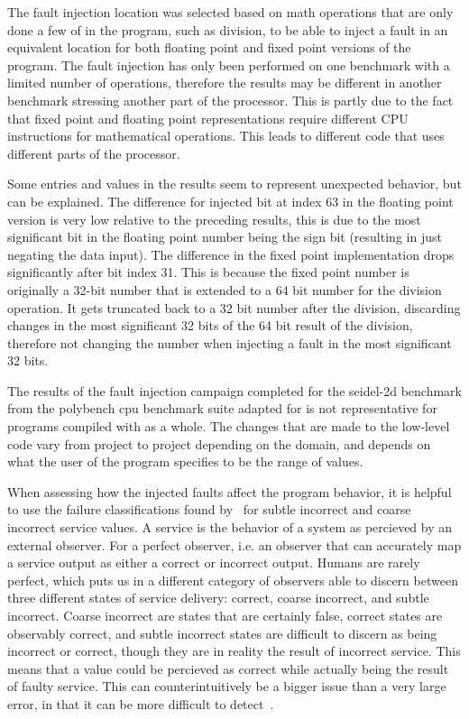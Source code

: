 The fault injection location was selected based on math operations that are only done a few of in the program, such as division, to be able to inject a fault in an equivalent location for both floating point and fixed point versions of the program. The fault injection has only been performed on one benchmark with a limited number of operations, therefore the results may be different in another benchmark stressing another part of the processor. This is partly due to the fact that fixed point and floating point representations require different CPU instructions for mathematical operations. This leads to different code that uses different parts of the processor. 

Some entries and values in the results seem to represent unexpected behavior, but can be explained. The difference for injected bit at index 63 in the floating point version is very low relative to the preceding results, this is due to the most significant bit in the floating point number being the sign bit (resulting in just negating the data input). 
The difference in the fixed point implementation drops significantly after bit index 31. This is because the fixed point number is originally a 32-bit number that is extended to a 64 bit number for the division operation. It gets truncated back to a 32 bit number after the division, discarding changes in the most significant 32 bits of the 64 bit result of the division, therefore not changing the number when injecting a fault in the most significant 32 bits. 

The results of the fault injection campaign completed for the seidel-2d benchmark from the polybench cpu benchmark suite adapted for \taffo{} is not representative for programs compiled with \taffo{} as a whole. The changes that are made to the low-level code vary from project to project depending on the domain, and depends on what the user of the program specifies to be the range of values. 


When assessing how the injected faults affect the program behavior, it is helpful to use the failure classifications found by~\citet{failure_class_with_respect_to_detection} for subtle incorrect and coarse incorrect service values. A service is the behavior of a system as percieved by an external observer. For a perfect observer, i.e. an observer that can accurately map a service output as either a correct or incorrect output. Humans are rarely perfect, which puts us in a different category of observers able to discern between three different states of service delivery: correct, coarse incorrect, and subtle incorrect.  Coarse incorrect are states that are certainly false, correct states are observably correct, and subtle incorrect states are difficult to discern as being incorrect or correct, though they are in reality the result of incorrect service. This means that a value could be percieved as correct while actually being the result of faulty service. This can counterintuitively be a bigger issue than a very large error, in that it can be more difficult to detect~\citep{hodge2004survey}.

